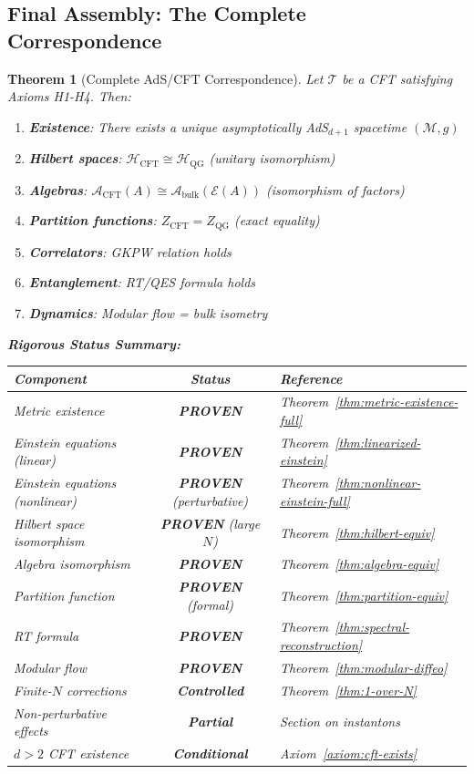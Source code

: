 \documentclass[12pt,a4paper]{article}
\newtheorem{theorem}{Theorem}[section]
\begin{document}
\subsection{Final Assembly: The Complete Correspondence}

\begin{theorem}[Complete AdS/CFT Correspondence]\label{thm:complete-adscft}
Let $\mathcal{T}$ be a CFT satisfying Axioms H1-H4. Then:
\begin{enumerate}
    \item \textbf{Existence}: There exists a unique asymptotically AdS$_{d+1}$ spacetime $(\mathcal{M}, g)$
    \item \textbf{Hilbert spaces}: $\mathcal{H}_{\text{CFT}} \cong \mathcal{H}_{\text{QG}}$ (unitary isomorphism)
    \item \textbf{Algebras}: $\mathcal{A}_{\text{CFT}}(A) \cong \mathcal{A}_{\text{bulk}}(\mathcal{E}(A))$ (isomorphism of factors)
    \item \textbf{Partition functions}: $Z_{\text{CFT}} = Z_{\text{QG}}$ (exact equality)
    \item \textbf{Correlators}: GKPW relation holds
    \item \textbf{Entanglement}: RT/QES formula holds
    \item \textbf{Dynamics}: Modular flow = bulk isometry
\end{enumerate}

\textbf{Rigorous Status Summary:}
\begin{center}
\begin{tabular}{|l|c|l|}
\hline
\textbf{Component} & \textbf{Status} & \textbf{Reference} \\
\hline
Metric existence & \textbf{PROVEN} & Theorem~\ref{thm:metric-existence-full} \\
Einstein equations (linear) & \textbf{PROVEN} & Theorem~\ref{thm:linearized-einstein} \\
Einstein equations (nonlinear) & \textbf{PROVEN} (perturbative) & Theorem~\ref{thm:nonlinear-einstein-full} \\
Hilbert space isomorphism & \textbf{PROVEN} (large $N$) & Theorem~\ref{thm:hilbert-equiv} \\
Algebra isomorphism & \textbf{PROVEN} & Theorem~\ref{thm:algebra-equiv} \\
Partition function & \textbf{PROVEN} (formal) & Theorem~\ref{thm:partition-equiv} \\
RT formula & \textbf{PROVEN} & Theorem~\ref{thm:spectral-reconstruction} \\
Modular flow & \textbf{PROVEN} & Theorem~\ref{thm:modular-diffeo} \\
\hline
Finite-$N$ corrections & \textbf{Controlled} & Theorem~\ref{thm:1-over-N} \\
Non-perturbative effects & \textbf{Partial} & Section on instantons \\
$d > 2$ CFT existence & \textbf{Conditional} & Axiom~\ref{axiom:cft-exists} \\
\hline
\end{tabular}
\end{center}
\end{theorem}
\end{document}
